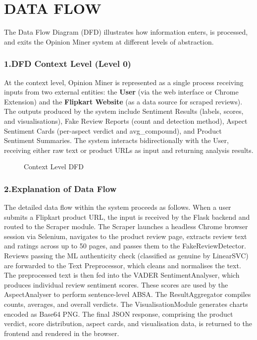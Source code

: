 \documentclass[12pt,a4paper]{report}
\begin{document}
\section{DATA FLOW}

The Data Flow Diagram (DFD) illustrates how information enters, is processed, and exits the Opinion Miner system at different levels of abstraction.

\subsubsection*{1.\quad DFD Context Level (Level 0)}

At the context level, Opinion Miner is represented as a single process receiving inputs from two external entities: the \textbf{User} (via the web interface or Chrome Extension) and the \textbf{Flipkart Website} (as a data source for scraped reviews). The outputs produced by the system include Sentiment Results (labels, scores, and visualisations), Fake Review Reports (count and detection method), Aspect Sentiment Cards (per-aspect verdict and avg\_compound), and Product Sentiment Summaries. The system interacts bidirectionally with the User, receiving either raw text or product URLs as input and returning analysis results.

\begin{figure}[H]
\centering
{}
\caption{Context Level DFD}
\label{fig:dfd}
\end{figure}

\subsubsection*{2.\quad Explanation of Data Flow}

The detailed data flow within the system proceeds as follows. When a user submits a Flipkart product URL, the input is received by the Flask backend and routed to the Scraper module. The Scraper launches a headless Chrome browser session via Selenium, navigates to the product review page, extracts review text and ratings across up to 50 pages, and passes them to the FakeReviewDetector. Reviews passing the ML authenticity check (classified as genuine by LinearSVC) are forwarded to the Text Preprocessor, which cleans and normalises the text. The preprocessed text is then fed into the VADER SentimentAnalyser, which produces individual review sentiment scores. These scores are used by the AspectAnalyser to perform sentence-level ABSA. The ResultAggregator compiles counts, averages, and overall verdicts. The VisualisationModule generates charts encoded as Base64 PNG. The final JSON response, comprising the product verdict, score distribution, aspect cards, and visualisation data, is returned to the frontend and rendered in the browser.
\end{document}
